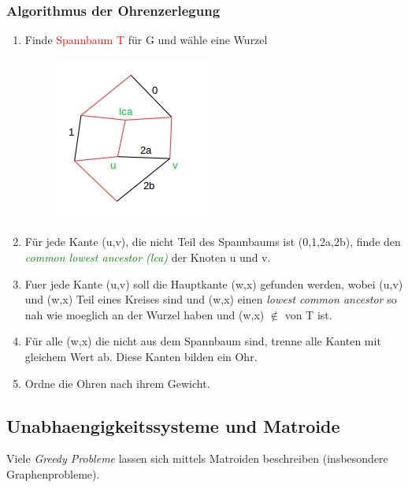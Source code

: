 \subsubsection{Algorithmus der Ohrenzerlegung}
\begin{enumerate}
	\item Finde \textcolor{red}{Spannbaum T} für G und wähle eine Wurzel\\
		\begin{figure}[htp]
		\centering
		\includegraphics[scale=1.00]{lectures/161111/pix/pic2.jpg}
		\end{figure}
	\item Für jede Kante (u,v), die nicht Teil des Spannbaums ist (0,1,2a,2b), finde den \textit{\textcolor{green}{common lowest ancestor (lca)}} der Knoten u und v.
	\item Fuer jede Kante (u,v) soll die Hauptkante (w,x) gefunden werden, wobei (u,v) und (w,x) Teil eines Kreises sind und (w,x) einen \textit{lowest common ancestor} so nah wie moeglich an der Wurzel haben und (w,x) $\notin$ von T ist.
	\item Für alle (w,x) die nicht aus dem Spannbaum sind, trenne alle Kanten mit gleichem Wert ab. Diese Kanten bilden ein Ohr.
	\item Ordne die Ohren nach ihrem Gewicht. 
\end{enumerate}

\newpage
\subsection{Unabhaengigkeitssysteme und Matroide}

Viele \textit{Greedy Probleme} lassen sich mittels Matroiden beschreiben (insbesondere Graphenprobleme).\newline


